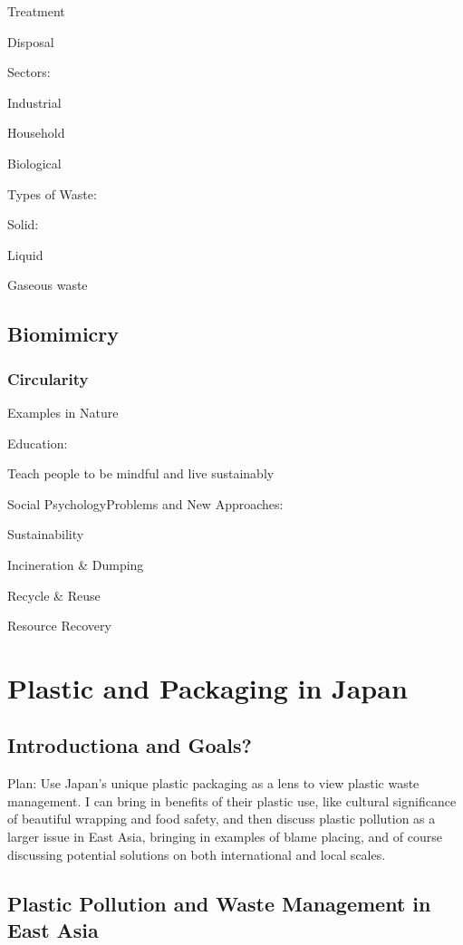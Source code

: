 \documentclass{book}\usepackage{knitr}
\begin{document}
\begin{knitrout}
\begin{kframe}
{Treatment

Disposal

Sectors:

Industrial

Household

Biological 

Types of Waste:

Solid:

Liquid

Gaseous waste

\section{Biomimicry}

\subsection{Circularity}

Examples in Nature

Education:

Teach people to be mindful and live sustainably

Social PsychologyProblems and New Approaches: 

Sustainability

Incineration \& Dumping

Recycle \& Reuse

Resource Recovery


\chapter{Plastic and Packaging in Japan}

\section{Introductiona and Goals?}

Plan: Use Japan's unique plastic packaging as a lens to view plastic waste management. I can bring in benefits of their plastic use, like cultural significance of beautiful wrapping and food safety, and then discuss plastic pollution as a larger issue in East Asia, bringing in examples of blame placing, and of course discussing potential solutions on both international and local scales. 

\section{Plastic Pollution and Waste Management in East Asia} 

}
\end{kframe}
\end{knitrout}
\end{document}
